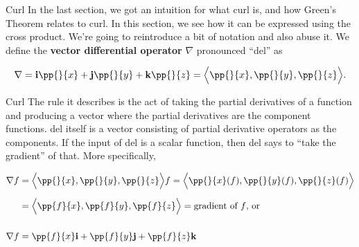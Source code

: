 \documentclass[11pt,english,
handout
]{beamer}
\begin{document}


\makebeamertitle









\begin{frame}{Curl}
\small
%
%
%
%
In the last section, we got an intuition for what curl is, and how Green's Theorem relates to curl. In this section, we see how it can be expressed using the cross product. We're going to reintroduce a bit of notation and also abuse it. \pause We define the \textbf{vector differential operator} $\nabla$ pronounced ``del'' as

\[
\nabla =\mathbf{i}\pp{}{x}+\mathbf{j}\pp{}{y}+\mathbf{k}\pp{}{z}=\Bigl<\pp{}{x},\pp{}{y},\pp{}{z}\Bigr>.
\]
\end{frame}
















\begin{frame}[t]{Curl}
\small
The rule it describes is the act of taking the partial derivatives of a function and producing a vector where the partial derivatives are the component functions. \pause del itself is a vector consisting of partial derivative operators as the components. \pause If the input of del is a scalar function, then del says to ``take the gradient'' of that. \pause More specifically, 

\begin{align*}
\nabla f&=\Bigl<\pp{}{x},\pp{}{y},\pp{}{z}\Bigr>f=\Bigl<\pp{}{x}(f),\pp{}{y}(f),\pp{}{z}(f)\Bigr>\\[2mm]
&=\Bigl<\pp{f}{x},\pp{f}{y},\pp{f}{z}\Bigr>=\text{gradient of $f$, or}\\[5mm]
\nabla f&=\pp{f}{x}\mathbf{i}+\pp{f}{y}\mathbf{j}+\pp{f}{z}\mathbf{k}
\end{align*}
\end{frame}
\end{document}
